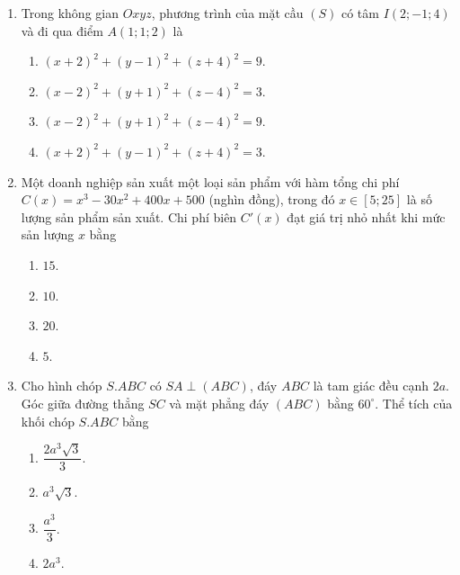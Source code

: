 \documentclass[12pt,a4paper]{article}
\begin{document}
\begin{enumerate}[label=\textbf{Câu \arabic*:}, leftmargin=*]
\item Trong không gian $Oxyz$, phương trình của mặt cầu $(S)$ có tâm $I(2; -1; 4)$ và đi qua điểm $A(1; 1; 2)$ là
\begin{enumerate}[label=\Alph*.]
    \item $(x + 2)^2 + (y - 1)^2 + (z + 4)^2 = 9$.
    \item $(x - 2)^2 + (y + 1)^2 + (z - 4)^2 = 3$.
    \item $(x - 2)^2 + (y + 1)^2 + (z - 4)^2 = 9$.
    \item $(x + 2)^2 + (y - 1)^2 + (z + 4)^2 = 3$.
\end{enumerate}

\item Một doanh nghiệp sản xuất một loại sản phẩm với hàm tổng chi phí $C(x) = x^3 - 30x^2 + 400x + 500$ (nghìn đồng), trong đó $x \in [5; 25]$ là số lượng sản phẩm sản xuất. Chi phí biên $C'(x)$ đạt giá trị nhỏ nhất khi mức sản lượng $x$ bằng
\begin{enumerate}[label=\Alph*.]
    \item $15$.
    \item $10$.
    \item $20$.
    \item $5$.
\end{enumerate}

\item Cho hình chóp $S.ABC$ có $SA \perp (ABC)$, đáy $ABC$ là tam giác đều cạnh $2a$. Góc giữa đường thẳng $SC$ và mặt phẳng đáy $(ABC)$ bằng $60^\circ$. Thể tích của khối chóp $S.ABC$ bằng
\begin{enumerate}[label=\Alph*.]
    \item $\dfrac{2a^3\sqrt{3}}{3}$.
    \item $a^3\sqrt{3}$.
    \item $\dfrac{a^3}{3}$.
    \item $2a^3$.
\end{enumerate}

\end{enumerate}

\vspace{0.4cm}
\end{document}
